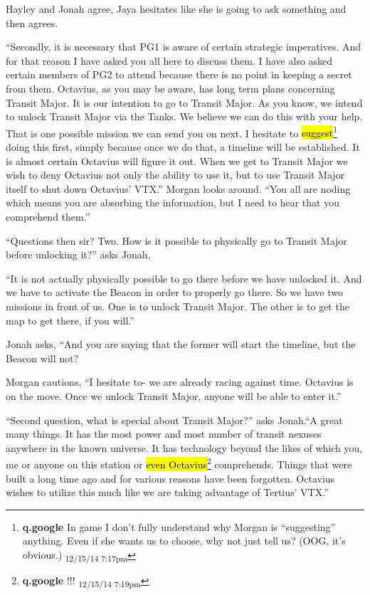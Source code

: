 Hayley and Jonah agree, Jaya hesitates like she is going to ask something and then agrees.



``Secondly, it is necessary that PG1 is aware of certain strategic imperatives.  And for that reason I have asked you all here to discuss them.  I have also asked certain members of PG2 to attend because  there is no point in keeping a secret from them.  Octavius, as you may be aware, has long term plans concerning Transit Major.  It is our intention to go to Transit Major.  As you know, we intend to unlock Transit Major via the Tanks.  We believe we can do this with your help.  That is one possible mission we can send you on next.  I hesitate to \hl{suggest}\footnote{\textbf{q.google }In game I don't fully understand why Morgan is ``suggesting'' anything.  Even if she wants us to choose, why not just tell us?  (OOG, it's obvious.) \textsubscript{12/15/14 7:17pm}} doing this first, simply because once we do that, a timeline will be established.  It is almost certain Octavius will figure it out.  When we get to Transit Major we wish to deny Octavius not only the ability to use it, but to use Transit Major itself to shut down Octavius' VTX.''  Morgan looks around.  ``You all are noding which means you are absorbing the information, but I need to hear that you comprehend them.''

``Questions then sir?  Two.   How is it possible to physically go to Transit Major before unlocking it?'' asks Jonah.

``It is not actually physically possible to go there before we have unlocked it.  And we have to activate the Beacon in order to properly go there.  So we have two missions in front of us.  One is to unlock Transit Major.  The other is to get the map to get there, if you will.''  

Jonah asks, ``And you are saying that the former will start the timeline, but the Beacon will not?

Morgan cautions, ``I hesitate to- we are already racing against time. Octavius is on the move.  Once we unlock Transit Major, anyone will be able to enter it.''

``Second question, what is special about Transit Major?'' asks Jonah.``A great many things.  It has the most power and most number of transit nexuses anywhere in the known universe.  It has technology beyond the likes of which you, me or anyone on this station or \hl{even Octavius}\footnote{\textbf{q.google }!!! \textsubscript{12/15/14 7:19pm}} comprehends. Things that were built a long time ago and for various reasons have been forgotten. Octavius wishes to utilize this much like we are taking advantage of Tertius' VTX.''

